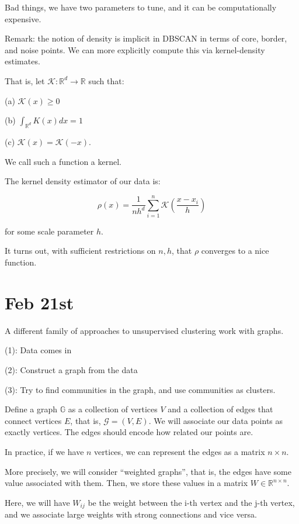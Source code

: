\documentclass[10pt]{article}
\begin{document}
Bad things, we have two parameters to tune, and it can be computationally expensive.

Remark: the notion of density is implicit in DBSCAN in terms of core, border, and noise points. We can more explicitly compute this via kernel-density estimates.

That is, let $\mathcal{K}: \mathbb{R}^d \to \mathbb{R}$ such that:

(a) $\mathcal{K}(x) \geq 0$

(b) $\int_{\mathbb{R}^d} K(x) dx = 1$

(c) $\mathcal{K}(x) = \mathcal{K}(-x)$.

We call such a function a kernel.

The kernel density estimator of our data is:

$$\rho(x) = \frac{1}{nh^d} \sum_{i=1}^n \mathcal{K}\left(  \frac{ x - x_i}{h}\right)$$

for some scale parameter $h$.

It turns out, with sufficient restrictions on $n, h$, that $\rho$ converges to a nice function.

\section*{Feb 21st}

A different family of approaches to unsupervised clustering work with graphs.

(1): Data comes in

(2): Construct a graph from the data

(3): Try to find communities in the graph, and use communities as clusters.

Define a graph $\mathbb{G}$ as a collection of vertices $V$ and a collection of edges that connect vertices $E$, that is, $\mathcal{G} = (V,E)$. We will associate our data points as exactly vertices. The edges should encode how related our points are.

In practice, if we have $n$ vertices, we can represent the edges as a matrix $n \times n$.

More precisely, we will consider “weighted graphs”, that is, the edges have some value associated with them. Then, we store these values in a matrix $W \in \mathbb{R}^{n \times n}$. 

Here, we will have $W_{ij}$ be the weight between the i-th vertex and the j-th vertex, and we associate large weights with strong connections and vice versa.
\end{document}
